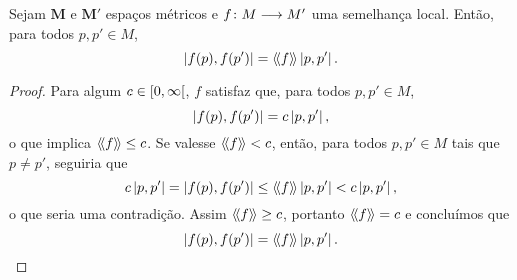 \begin{proposition}
Sejam $\bm{M}$ e $\bm{M'}$ espaços métricos e $f\colon \allowbreak M \longrightarrow M'$ uma semelhança local. Então, para todos $p,p' \in M$,
	\begin{equation*}
	\left\vert{f(p)},{f(p')}\right\vert = \langle\!\langle{f}\rangle\!\rangle \left\vert{p},{p'}\right\vert.
	\end{equation*}
\end{proposition}
\begin{proof}
Para algum $c \in \left[0,\allowbreak \infty\right[$, $f$ satisfaz que, para todos $p,p' \in M$,
	\begin{equation*}
	\left\vert{f(p)},{f(p')}\right\vert = c \left\vert{p},{p'}\right\vert,
	\end{equation*}
o que implica $\langle\!\langle{f}\rangle\!\rangle \leq c$. Se valesse $\langle\!\langle{f}\rangle\!\rangle<c$, então, para todos $p,p' \in M$ tais que $p \neq p'$, seguiria que
	\begin{equation*}
	c \left\vert{p},{p'}\right\vert = \left\vert{f(p)},{f(p')}\right\vert \leq \langle\!\langle{f}\rangle\!\rangle\left\vert{p},{p'}\right\vert < c \left\vert{p},{p'}\right\vert,
	\end{equation*}
o que seria uma contradição. Assim $\langle\!\langle{f}\rangle\!\rangle \geq c$, portanto $\langle\!\langle{f}\rangle\!\rangle=c$ e concluímos que
	\begin{equation*}
	\left\vert{f(p)},{f(p')}\right\vert = \langle\!\langle{f}\rangle\!\rangle \left\vert{p},{p'}\right\vert.
	\qedhere
	\end{equation*}
\end{proof}

